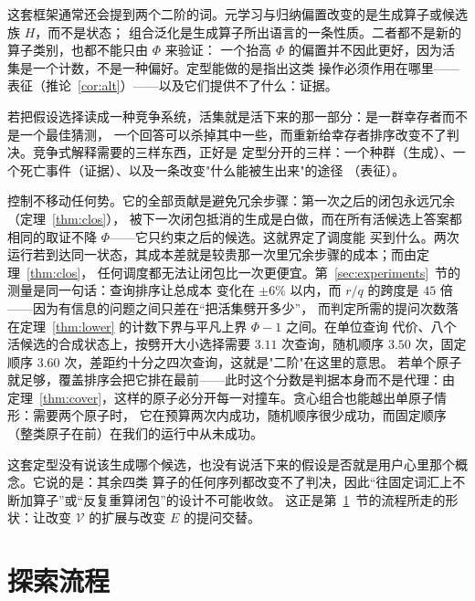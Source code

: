 \documentclass[11pt]{ctexart}
\newcommand{\Vocab}{\mathcal{V}}
\begin{document}
这套框架通常还会提到两个二阶的词。元学习与归纳偏置改变的是生成算子或候选族 $H$，而不是状态；
组合泛化是生成算子所出语言的一条性质。二者都不是新的算子类别，也都不能只由 $\Phi$ 来验证：
一个抬高 $\Phi$ 的偏置并不因此更好，因为活集是一个计数，不是一种偏好。定型能做的是指出这类
操作必须作用在哪里——表征（推论~\ref{cor:alt}）——以及它们提供不了什么：证据。

若把假设选择读成一种竞争系统，活集就是活下来的那一部分：是一群幸存者而不是一个最佳猜测，
一个回答可以杀掉其中一些，而重新给幸存者排序改变不了判决。竞争式解释需要的三样东西，正好是
定型分开的三样：一个种群（生成）、一个死亡事件（证据）、以及一条改变"什么能被生出来"的途径
（表征）。

控制不移动任何势。它的全部贡献是避免冗余步骤：第一次之后的闭包永远冗余（定理~\ref{thm:clos}），
被下一次闭包抵消的生成是白做，而在所有活候选上答案都相同的取证不降 $\Phi$——它只约束之后的候选。这就界定了调度能
买到什么。两次运行若到达同一状态，其成本差就是较贵那一次里冗余步骤的成本；而由定理~\ref{thm:clos}，
任何调度都无法让闭包比一次更便宜。第~\ref{sec:experiments}~节的测量是同一句话：查询排序让总成本
变化在 $\pm 6\%$ 以内，而 $r/q$ 的跨度是 $45$ 倍——因为有信息的问题之间只差在“把活集劈开多少”，
而判定所需的提问次数落在定理~\ref{thm:lower} 的计数下界与平凡上界 $\Phi-1$ 之间。在单位查询
代价、八个活候选的合成状态上，按劈开大小选择需要 $3.11$ 次查询，随机顺序 $3.50$ 次，固定顺序
$3.60$ 次，差距约十分之四次查询，这就是"二阶"在这里的意思。
若单个原子就足够，覆盖排序会把它排在最前——此时这个分数是判据本身而不是代理：由
定理~\ref{thm:cover}，这样的原子必分开每一对撞车。贪心组合也能越出单原子情形：需要两个原子时，
它在预算两次内成功，随机顺序很少成功，而固定顺序（整类原子在前）在我们的运行中从未成功。

这套定型没有说该生成哪个候选，也没有说活下来的假设是否就是用户心里那个概念。它说的是：其余四类
算子的任何序列都改变不了判决，因此“往固定词汇上不断加算子”或“反复重算闭包”的设计不可能收敛。
这正是第~\ref{sec:exploration}~节的流程所走的形状：让改变 $\Vocab$ 的扩展与改变 $E$ 的提问交替。

\section{探索流程}\label{sec:exploration}
\end{document}
